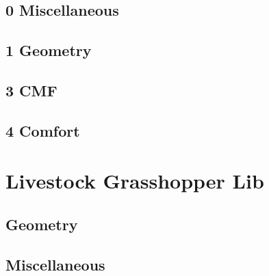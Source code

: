 \documentclass[letterpaper,10pt,english]{sphinxmanual}
\begin{document}
\section{0 \textbar{} Miscellaneous}
\label{\detokenize{component classes:module-livestock.components.misc}}\label{\detokenize{component classes:miscellaneous}}

\section{1 \textbar{} Geometry}
\label{\detokenize{component classes:geometry}}\label{\detokenize{component classes:module-livestock.components.geometry}}

\section{3 \textbar{} CMF}
\label{\detokenize{component classes:module-livestock.components.comp_cmf}}\label{\detokenize{component classes:cmf}}

\section{4 \textbar{} Comfort}
\label{\detokenize{component classes:comfort}}\label{\detokenize{component classes:module-livestock.components.comfort}}

\chapter{Livestock Grasshopper Lib}
\label{\detokenize{lib:livestock-grasshopper-lib}}\label{\detokenize{lib::doc}}

\section{Geometry}
\label{\detokenize{lib:geometry}}\label{\detokenize{lib:module-livestock.lib.geometry}}

\section{Miscellaneous}
\label{\detokenize{lib:module-livestock.lib.misc}}\label{\detokenize{lib:miscellaneous}}
\end{document}
